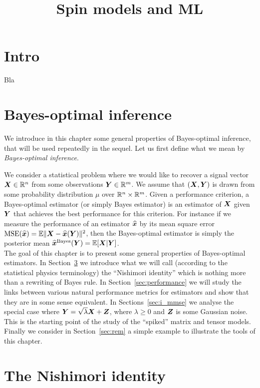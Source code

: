 \documentclass[12pt,nocut]{article}
\title{Spin models and ML}
\date{}
\begin{document}
\maketitle{}

\section{Intro}
Bla

\section{Bayes-optimal inference}\label{chap:gaussian}
We introduce in this chapter some general properties of Bayes-optimal inference, that will be used repeatedly in the sequel.
Let us first define what we mean by \textit{Bayes-optimal inference}.

We consider a statistical problem where we would like to recover a signal vector ${\boldsymbol X} \in \mathbb{R}^n$ from some observations ${\boldsymbol Y} \in \mathbb{R}^m$.
We assume that $({\boldsymbol X},{\boldsymbol Y})$ is drawn from some probability distribution $\mu$ over $\mathbb{R}^{n} \times \mathbb{R}^m$. Given a performance criterion, a Bayes-optimal estimator (or simply Bayes estimator) is an estimator of ${\boldsymbol X}$ given ${\boldsymbol Y}$ that achieves the best performance for this criterion. For instance if we measure the performance of an estimator $\widehat{{\boldsymbol x}}$ by its mean square error ${{\rm MSE}}(\widehat{{\boldsymbol x}}) = \mathbb{E} \| {\boldsymbol X} - \widehat{{\boldsymbol x}}({\boldsymbol Y}) \|^2$, then the Bayes-optimal estimator is simply the posterior mean $\widehat{{\boldsymbol x}}^{\rm Bayes}({\boldsymbol Y}) = \mathbb{E}[{\boldsymbol X}|{\boldsymbol Y}]$.
\\

The goal of this chapter is to present some general properties of Bayes-optimal estimators. In Section~\ref{sec:nishimori} we introduce what we will call (according to the statistical physics terminology) the ``Nishimori identity'' which is nothing more than a rewriting of Bayes rule.
In Section~\ref{sec:performance} we will study the links between various natural performance metrics for estimators and show that they are in some sense equivalent.
In Sections~\ref{sec:i_mmse} we analyse the special case where ${\boldsymbol Y} = \sqrt{\lambda}{\boldsymbol X} + {\boldsymbol Z}$, where $\lambda \geq 0$ and ${\boldsymbol Z}$ is some Gaussian noise. This is the starting point of the study of the ``spiked'' matrix and tensor models. Finally we consider in Section~\ref{sec:rem} a simple example to illustrate the tools of this chapter.

\section{The Nishimori identity}\label{sec:nishimori}
\end{document}
